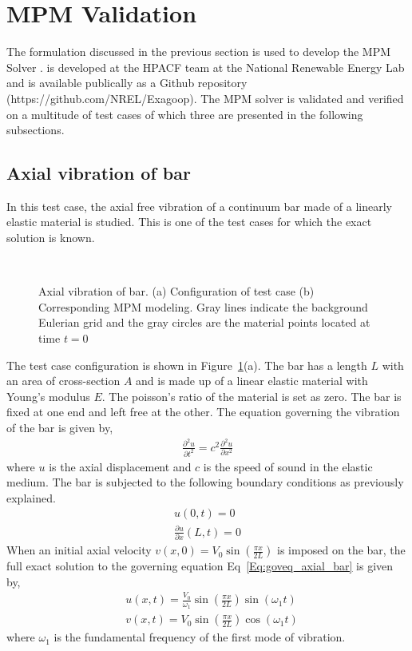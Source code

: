 \section{MPM Validation}
The formulation discussed in the previous section is used to develop the MPM Solver \Ex. \Ex is developed at the HPACF team at the National Renewable Energy Lab and is available publically as a Github repository (https://github.com/NREL/Exagoop).
The \Ex  MPM solver is validated and verified on a multitude of test cases of which three are presented in the following subsections.

\subsection{Axial vibration of bar}
In this test case, the axial free vibration of a continuum bar made of a linearly elastic material is studied. This is one of the test cases for which the exact solution is known. 
\begin{figure}[h]
\\
\caption{Axial vibration of bar. (a) Configuration of test case (b) Corresponding MPM modeling. Gray lines indicate the background Eulerian grid and the gray circles are the material points located at time $t=0$}
\label{Fig:TestCaseAxBar}
\end{figure}
The test case configuration is shown in Figure~\ref{Fig:TestCaseAxBar}(a). The bar has a length $L$ with an area of cross-section $A$ and is made up of a linear elastic material with Young's modulus $E$. The poisson's ratio of the material is set as zero. The bar is fixed at one end and left free at the other. The equation governing the vibration of the bar is given by,
\begin{align}
	\frac{\partial^2 u}{\partial t^2}=c^2 \frac{\partial^2 u}{\partial x^2}
\label{Eq:goveq_axial_bar}
\end{align}
where $u$ is the axial displacement and $c$ is the speed of sound in the elastic medium. The bar is subjected to the following boundary conditions as previously explained. 
\begin{align}
	u(0,t)=0\\
	\frac{\partial u}{\partial x} (L,t) = 0
\end{align}
When an initial axial velocity $v(x,0)= V_0 \sin \left(\frac{\pi x}{2 L}\right)$ is imposed on the bar, the full exact solution to the governing equation Eq~\ref{Eq:goveq_axial_bar} is given by,
\begin{align}
& u(x, t)=\frac{V_0}{\omega_1} \sin \left(\frac{\pi x}{2 L}\right) \sin \left(\omega_1 t\right) \\
& v(x, t)=V_0 \sin \left(\frac{\pi x}{2 L}\right) \cos \left(\omega_1 t\right)
\end{align}
where $\omega_1$ is the fundamental frequency of the first mode of vibration.

